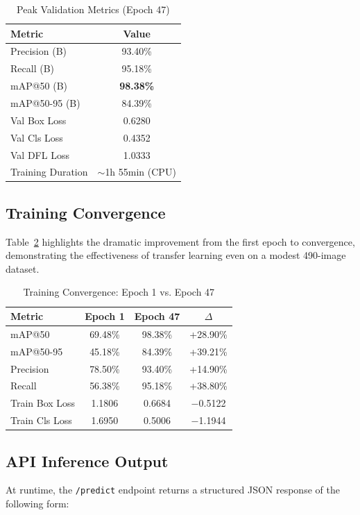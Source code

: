 \documentclass[journal]{IEEEtran}
\begin{document}
\begin{table}[H]
\caption{Peak Validation Metrics (Epoch 47)}
\label{tab:results}
\centering
\begin{tabular}{lc}
\toprule
\textbf{Metric} & \textbf{Value} \\
\midrule
Precision (B)       & 93.40\% \\
Recall (B)          & 95.18\% \\
mAP@50 (B)          & \textbf{98.38\%} \\
mAP@50-95 (B)       & 84.39\% \\
\midrule
Val Box Loss        & 0.6280 \\
Val Cls Loss        & 0.4352 \\
Val DFL Loss        & 1.0333 \\
\midrule
Training Duration   & $\sim$1h 55min (CPU) \\
\bottomrule
\end{tabular}
\end{table}

\subsection{Training Convergence}
Table~\ref{tab:convergence} highlights the dramatic improvement from the first epoch to convergence, demonstrating the effectiveness of transfer learning even on a modest 490-image dataset.

\begin{table}[H]
\caption{Training Convergence: Epoch 1 vs. Epoch 47}
\label{tab:convergence}
\centering
\begin{tabular}{lccc}
\toprule
\textbf{Metric} & \textbf{Epoch 1} & \textbf{Epoch 47} & \textbf{$\Delta$} \\
\midrule
mAP@50          & 69.48\%  & 98.38\%  & +28.90\% \\
mAP@50-95       & 45.18\%  & 84.39\%  & +39.21\% \\
Precision       & 78.50\%  & 93.40\%  & +14.90\% \\
Recall          & 56.38\%  & 95.18\%  & +38.80\% \\
Train Box Loss  & 1.1806   & 0.6684   & $-$0.5122 \\
Train Cls Loss  & 1.6950   & 0.5006   & $-$1.1944 \\
\bottomrule
\end{tabular}
\end{table}

\subsection{API Inference Output}
At runtime, the \texttt{/predict} endpoint returns a structured JSON response of the following form:
\end{document}
